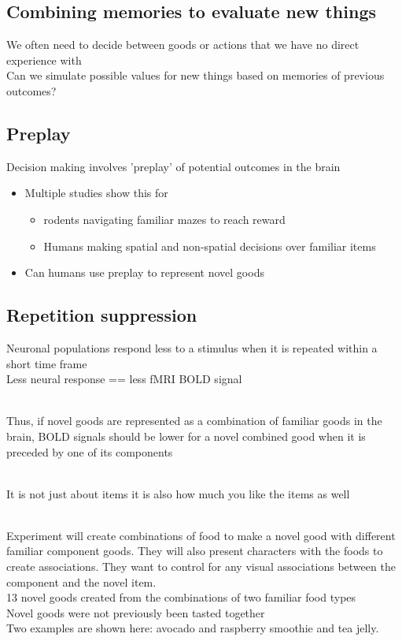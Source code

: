 \subsection{Combining memories to evaluate new things}
We often need to decide between goods or actions that we have no direct experience with
\\Can we simulate possible values for new things based on memories of previous outcomes?

\subsection{Preplay}
Decision making involves 'preplay' of potential outcomes in the brain
\begin{itemize}
    \item Multiple studies show this for 
    \begin{itemize}
        \item rodents navigating familiar mazes to reach reward
        \item Humans making spatial and non-spatial decisions over familiar items
    \end{itemize}
    \item Can humans use preplay to represent novel goods
\end{itemize}
\subsection{Repetition suppression}
Neuronal populations respond less to a stimulus when it is repeated within a short time frame
\\Less neural response == less fMRI BOLD signal

\\Thus, if novel goods are represented as a combination of familiar goods in the brain, BOLD signals should be lower for a novel combined good when it is preceded by one of its components

\\It is not just about items it is also how much you like the items as well

\\Experiment will create combinations of food to make a novel good with different familiar component goods. They will also present characters with the foods to create associations. They want to control for any visual associations between the component and the novel item.
\\13 novel goods created from the combinations of two familiar food types
\\Novel goods were not previously been tasted together
\\Two examples are shown here: avocado and raspberry smoothie and tea jelly.
